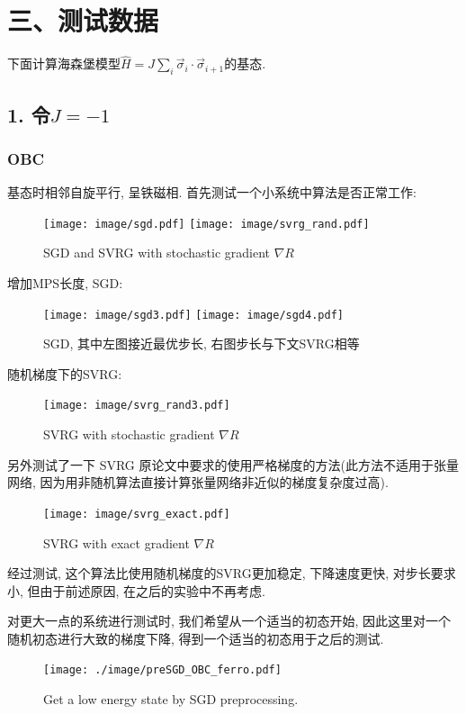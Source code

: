 \documentclass{article}
\begin{document}
\section*{三、测试数据}
下面计算海森堡模型$\hat{H}=J\sum_i \vec{\sigma}_i\cdot\vec{\sigma}_{i+1}$的基态. 

\subsection*{1. 令$J = -1$}
\subsubsection*{OBC}
基态时相邻自旋平行, 呈铁磁相. 首先测试一个小系统中算法是否正常工作:
\begin{figure}[!ht]
    \texttt{[image: image/sgd.pdf]}
    \texttt{[image: image/svrg\_rand.pdf]}
    \caption{SGD and SVRG with stochastic gradient $\nabla R$}
    \label{fig:SGD_SVRG}
\end{figure}

\noindent
增加MPS长度, SGD:
\begin{figure}[h!]
    \centering
    \texttt{[image: image/sgd3.pdf]}
    \texttt{[image: image/sgd4.pdf]}
    \caption{SGD, 其中左图接近最优步长, 右图步长与下文SVRG相等}
    \label{fig:SGD3}
\end{figure}

随机梯度下的SVRG:
\begin{figure}[h!]
    \centering
    \texttt{[image: image/svrg\_rand3.pdf]}
    \caption{SVRG with stochastic gradient $\nabla R$}
    \label{fig:SVRG_rand02}
\end{figure}

\clearpage

\noindent
另外测试了一下 SVRG 原论文\cite{johnsonAcceleratingStochasticGradient}中要求的使用严格梯度的方法(此方法不适用于张量网络, 因为用非随机算法直接计算张量网络非近似的梯度复杂度过高).
\begin{figure}[!ht]
    \centering
    \texttt{[image: image/svrg\_exact.pdf]}
    \caption{SVRG with exact gradient $\nabla R$}
    \label{fig:SVRG_rand}
\end{figure}
经过测试, 这个算法比使用随机梯度的SVRG更加稳定, 下降速度更快, 对步长要求小, 但由于前述原因, 在之后的实验中不再考虑.

对更大一点的系统进行测试时, 我们希望从一个适当的初态开始, 因此这里对一个随机初态进行大致的梯度下降, 得到一个适当的初态用于之后的测试.
\begin{figure}[!ht]
	\centering
	\texttt{[image: ./image/preSGD\_OBC\_ferro.pdf]}
	\caption{Get a low energy state by SGD preprocessing.}
\end{figure}
\end{document}
